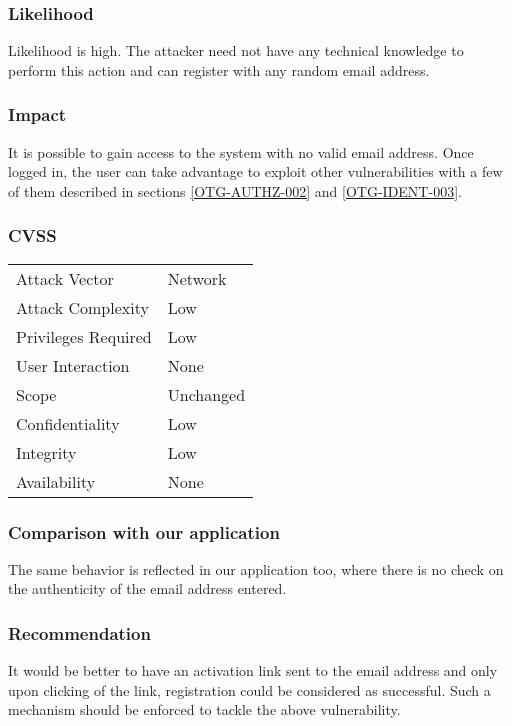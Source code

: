 \subsubsection{Likelihood}
Likelihood is high.
The attacker need not have any technical knowledge to perform this action and can register with any random email address.

\subsubsection{Impact}
It is possible to gain access to the system with no valid email address. Once logged in, the user can take advantage to exploit other vulnerabilities with a few of them described in sections \ref{OTG-AUTHZ-002} and \ref{OTG-IDENT-003}.

\subsubsection{CVSS}
\begin{tabular}{l | l}
Attack Vector		& Network \\
Attack Complexity	& Low \\
Privileges Required & Low \\
User Interaction	& None \\
Scope				& Unchanged \\
Confidentiality		& Low \\
Integrity			& Low \\
Availability		& None
\end{tabular}

\subsubsection{Comparison with our application}
The same behavior is reflected in our application too, where there is no check on the authenticity of the email address entered.

\subsubsection{Recommendation}
It would be better to have an activation link sent to the email address and only upon clicking of the link, registration could be considered as successful. Such a mechanism should be enforced to tackle the above vulnerability.

\clearpage